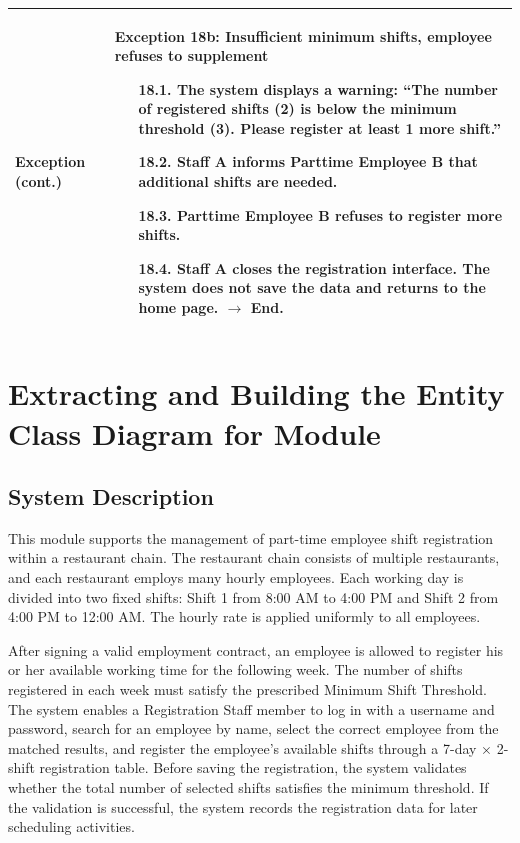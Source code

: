 \begin{longtable}{|p{3cm}|p{13cm}|}
\textbf{Exception (cont.)} &
\textbf{Exception 18b: Insufficient minimum shifts, employee refuses to supplement}
\begin{enumerate}
    \item[18.1.] The system displays a warning: ``The number of registered shifts (2) is below the minimum threshold (3). Please register at least 1 more shift.''
    \item[18.2.] Staff A informs Parttime Employee B that additional shifts are needed.
    \item[18.3.] Parttime Employee B refuses to register more shifts.
    \item[18.4.] Staff A closes the registration interface. The system does not save the data and returns to the home page. $\rightarrow$ End.
\end{enumerate} \\
\hline
\end{longtable}
\renewcommand{\arraystretch}{1}

\section{Extracting and Building the Entity Class Diagram for Module}


\subsection{System Description}

This module supports the management of part-time employee shift registration within a restaurant chain. The restaurant chain consists of multiple restaurants, and each restaurant employs many hourly employees. Each working day is divided into two fixed shifts: Shift 1 from 8:00 AM to 4:00 PM and Shift 2 from 4:00 PM to 12:00 AM. The hourly rate is applied uniformly to all employees.

After signing a valid employment contract, an employee is allowed to register his or her available working time for the following week. The number of shifts registered in each week must satisfy the prescribed Minimum Shift Threshold. The system enables a Registration Staff member to log in with a username and password, search for an employee by name, select the correct employee from the matched results, and register the employee's available shifts through a 7-day $\times$ 2-shift registration table. Before saving the registration, the system validates whether the total number of selected shifts satisfies the minimum threshold. If the validation is successful, the system records the registration data for later scheduling activities.

